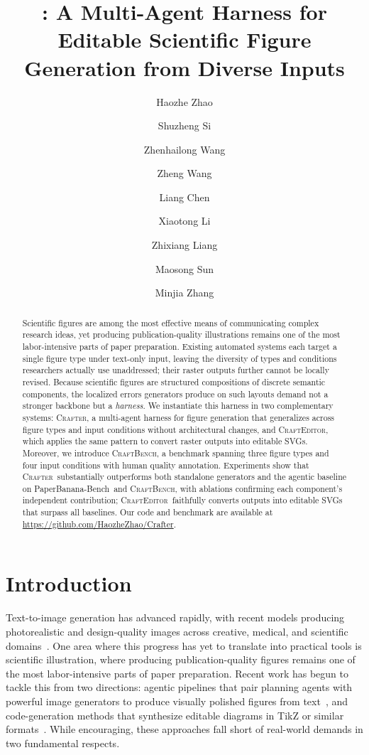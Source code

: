 \documentclass{llmxive}
\title{\Crafter: A Multi-Agent Harness for Editable Scientific Figure Generation from Diverse Inputs}
\author{Haozhe Zhao \and Shuzheng Si \and Zhenhailong Wang \and Zheng Wang \and Liang Chen \and Xiaotong Li \and Zhixiang Liang \and Maosong Sun \and Minjia Zhang}
\providecommand{\Crafter}{\textsc{Crafter}\xspace}
\providecommand{\Editor}{\textsc{CraftEditor}\xspace}
\providecommand{\CrafterBench}{\textsc{CraftBench}\xspace}
\providecommand{\PaperBananaBench}{PaperBanana-Bench\xspace}
\begin{document}
\maketitle
\begin{abstract}
Scientific figures are among the most effective means of communicating complex research ideas, yet producing publication-quality illustrations remains one of the most labor-intensive parts of paper preparation. Existing automated systems each target a single figure type under text-only input, leaving the diversity of types and conditions researchers actually use unaddressed; their raster outputs further cannot be locally revised. Because scientific figures are structured compositions of discrete semantic components, the localized errors generators produce on such layouts demand not a stronger backbone but a \emph{harness}. We instantiate this harness in two complementary systems: \Crafter, a multi-agent harness for figure generation that generalizes across figure types and input conditions without architectural changes, and \Editor, which applies the same pattern to convert raster outputs into editable SVGs. Moreover, we introduce \CrafterBench, a benchmark spanning three figure types and
four input conditions with human quality annotation. Experiments show
that \Crafter\ substantially outperforms both standalone generators and
the agentic baseline on \PaperBananaBench\ and \CrafterBench,
with ablations confirming each component's independent contribution;
\Editor\ faithfully converts outputs into editable SVGs that surpass all baselines. Our code and benchmark are available at \url{https://github.com/HaozheZhao/Crafter}.
\end{abstract}
\section{Introduction}
\label{sec:intro}

Text-to-image generation has advanced rapidly, with recent models producing photorealistic and design-quality images across creative, medical, and scientific domains~\citep{qwen2025image,glm2025image,labs2024flux}. One area where this progress has yet to translate into practical tools is scientific illustration, where producing publication-quality figures remains one of the most labor-intensive parts of paper preparation. Recent work has begun to tackle this from two directions: agentic pipelines that pair planning agents with powerful image generators to produce visually polished figures from text~\citep{zhu2026paperbanana,zhu2026autofigure,sun2025p2p,guo2026paper2sysarch,kukreja2026cage,yang2026omnidiagram}, and code-generation methods that synthesize editable diagrams in TikZ or similar formats~\citep{belouadi2024automatikz,zala2024diagrammergpt,greisinger2026tikzilla,PPTAgent}. While encouraging, these approaches fall short of real-world demands in
two fundamental respects.
\end{document}
